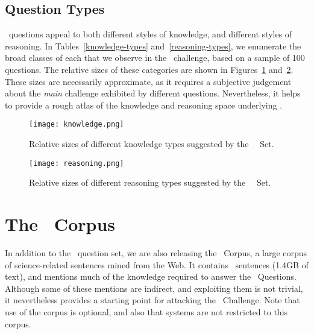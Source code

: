 \subsection{Question Types}

\ASC~questions appeal to both different styles of knowledge, and different styles of reasoning.
In Tables~\ref{knowledge-types} and~\ref{reasoning-types}, we enumerate the broad classes of each
that we observe in the \ASC~challenge, based on a sample of 100 questions. The relative
sizes of these categories are shown in Figures~\ref{knowledge-pie-chart} and~\ref{reasoning-pie-chart}.
These sizes are necessarily approximate, as it requires a subjective judgement about the {\it main} challenge exhibited by
different questions. Nevertheless, it helps to provide a rough atlas of the knowledge and reasoning
space underlying \ASC.

\begin{figure}[h]
\centering
\texttt{[image: knowledge.png]}
\caption{Relative sizes of different knowledge types suggested by the \ASC~\Challenge~Set. \label{knowledge-pie-chart}}
\end{figure}

\begin{figure}[h]
\centering
\texttt{[image: reasoning.png]}
\caption{Relative sizes of different reasoning types suggested by the \ASC~\Challenge~Set. \label{reasoning-pie-chart}}
\end{figure}

\section{The \ASC~Corpus}

In addition to the \ASC~question set, we are also releasing the \ASC~Corpus, a large corpus of
science-related sentences mined from the Web. It contains \BUSCSIZE~sentences (1.4GB of text),
and mentions much of the knowledge required to answer the \Challenge~Questions. Although
some of these mentions are indirect, and exploiting them is not trivial, it nevertheless
provides a starting point for attacking the \ASC~Challenge.
Note that use of the corpus is optional, and also that systems are not
restricted to this corpus.

